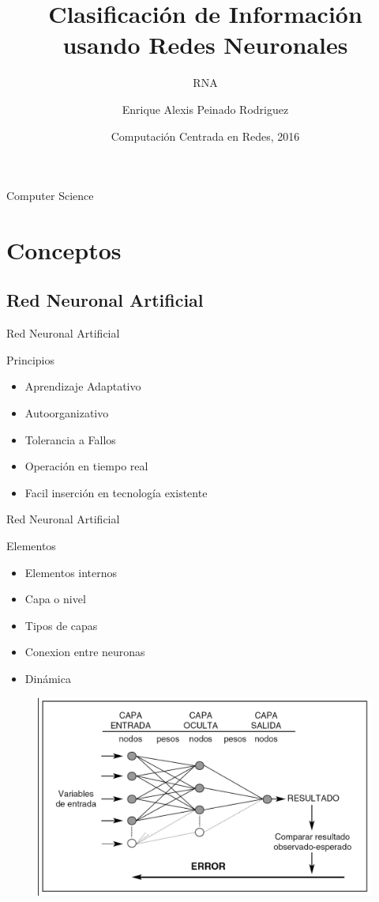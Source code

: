 \documentclass{beamer}
\title{Clasificación de Información usando Redes Neuronales}
\subtitle{RNA}
\author{Enrique Alexis Peinado Rodriguez}
\institute[Universidad Nacional De Ingenieria]
{
  Ciencia de la Computación\\
  Universidad Nacional de Ingeniería
}
\date{Computación Centrada en Redes, 2016}
\begin{document}
\begin{frame}
  \titlepage
\end{frame}

\begin{frame}{Computer Science}
  \tableofcontents
\end{frame}

\section{Conceptos}

\subsection{Red Neuronal Artificial}

\begin{frame}{Red Neuronal Artificial}
\begin{block}{Principios}\pause
\begin{itemize}
\item {Aprendizaje Adaptativo\pause}
\item {Autoorganizativo\pause}
\item {Tolerancia a Fallos\pause}
\item {Operación en tiempo real\pause}
\item {Facil inserción en tecnología existente}
\end{itemize}
\end{block}
\end{frame}

\begin{frame}{Red Neuronal Artificial}
\begin{block}{Elementos}\pause
\begin{itemize}
\item {Elementos internos\pause}
\item {Capa o nivel\pause}
\item {Tipos de capas\pause}
\item {Conexion entre neuronas\pause}
\item {Dinámica}
\end{itemize}
\begin{figure}
\includegraphics[scale=0.15]{elementos1.png}
\centering
\end{figure}
\end{block}
\end{frame}
\end{document}
